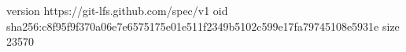 version https://git-lfs.github.com/spec/v1
oid sha256:c8f95f9f370a06e7e6575175e01e511f2349b5102c599e17fa79745108e5931e
size 23570
